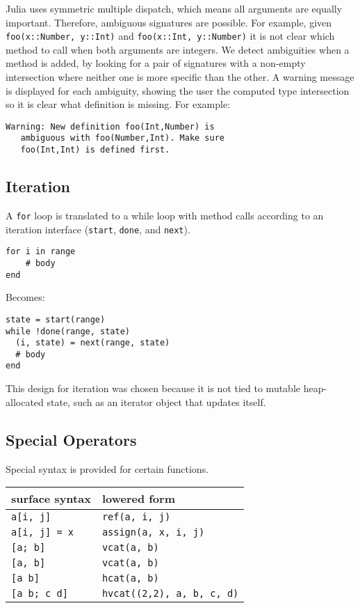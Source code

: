 \documentclass[9pt]{sigplanconf}
\begin{document}
Julia uses symmetric multiple dispatch, which means all arguments
are equally important. Therefore, ambiguous signatures are possible.
For example, given {\tt foo(x::Number, y::Int)} and
{\tt foo(x::Int, y::Number)} it is not clear which method to call when both
arguments are integers. We detect ambiguities when a method is added, by
looking for a pair of signatures with a non-empty intersection where neither
one is more specific than the other. A warning message is displayed for each
ambiguity, showing the user the computed type intersection so it is clear what
definition is missing. For example:

\begin{verbatim}
Warning: New definition foo(Int,Number) is
   ambiguous with foo(Number,Int). Make sure
   foo(Int,Int) is defined first.
\end{verbatim}


\subsection{Iteration}

A {\tt for} loop is translated to a while loop with method calls according
to an iteration interface ({\tt start}, {\tt done}, and {\tt next}).

\begin{verbatim}
for i in range
    # body
end
\end{verbatim}

Becomes:

\begin{verbatim}
state = start(range)
while !done(range, state)
  (i, state) = next(range, state)
  # body
end
\end{verbatim}

This design for iteration was chosen because it is not tied to mutable
heap-allocated state, such as an iterator object that updates itself.

\subsection{Special Operators}

Special syntax is provided for certain functions.

\begin{tabular}{|l|l|}\hline
surface syntax     & lowered form \\\hline \hline
{\tt a[i, j]}      & {\tt ref(a, i, j)} \\\hline
{\tt a[i, j] = x}  & {\tt assign(a, x, i, j)} \\\hline
{\tt [a; b]}       & {\tt vcat(a, b)} \\\hline
{\tt [a, b]}       & {\tt vcat(a, b)} \\\hline
{\tt [a b]}        & {\tt hcat(a, b)} \\\hline
{\tt [a b; c d]}   & {\tt hvcat((2,2), a, b, c, d)}\\\hline
\end{tabular}
\end{document}
